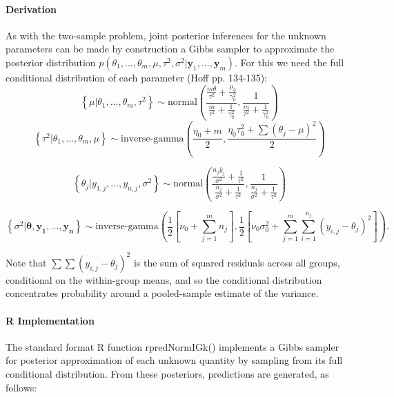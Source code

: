 \documentclass[12pt, a4paper]{article}
\begin{document}
      \paragraph{Derivation}
      As with the two-sample problem, joint posterior inferences for the unknown parameters can be made by construction a Gibbs sampler to approximate the posterior distribution $p\left(\theta_1,...,\theta_m,\mu,\tau^2,\sigma^2|\mathbf{y}_1,...,\mathbf{y}_m\right)$.  For this we need the full conditional distribution of each parameter (Hoff pp. 134-135):
      $$\left\{\mu|\theta_1,...,\theta_m,\tau^2\right\} \sim \text{normal}\left(\dfrac{\frac{m\bar{\theta}}{\tau^2} + \frac{\mu_0}{\gamma^2_0}}{\frac{m}{\tau^2} + \frac{1}{\gamma^2_0}},\dfrac{1}{\frac{m}{\tau^2}+\frac{1}{\gamma^2_0}}\right)$$
      $$\left\{\tau^2|\theta_1,...,\theta_m,\mu\right\} \sim \text{inverse-gamma}\left(\dfrac{\eta_0 + m}{2},\dfrac{\eta_0\tau^2_0 + \sum\left(\theta_j-\mu\right)^2}{2}\right)$$

      $$\left\{\theta_j|y_{1,j},...,y_{n,j},\sigma^2\right\} \sim \text{normal}\left(\dfrac{\frac{n_j\bar{y}_j}{\sigma^2} + \frac{1}{\tau^2}}{\frac{n_j}{\sigma^2}+\frac{1}{\tau^2}},\dfrac{1}{\frac{n_j}{\sigma^2}+\frac{1}{\tau^2}}\right)$$

      $$\left\{\sigma^2|\mathbf{\theta,y_1,...,y_n}\right\} \sim \text{inverse-gamma}\left(\dfrac{1}{2}\left[\nu_0 + \sum_{j=1}^m n_j\right],\dfrac{1}{2}\left[\nu_0\sigma^2_0 + \sum_{j=1}^m\sum_{i=1}^{n_j}\left(y_{i,j}-\theta_j\right)^2\right]\right).$$

      Note that $\sum\sum\left(y_{i,j}-\theta_j\right)^2$ is the sum of squared residuals across all groups, conditional on the within-group means, and so the conditional distribution concentrates probability around a pooled-sample estimate of the variance.


      \paragraph{R Implementation}

      The standard format R function rpredNormIGk() implements a Gibbs sampler for posterior approximation of each unknown quantity by sampling from its full conditional distribution.  From these posteriors, predictions are generated, as follows:
\end{document}
